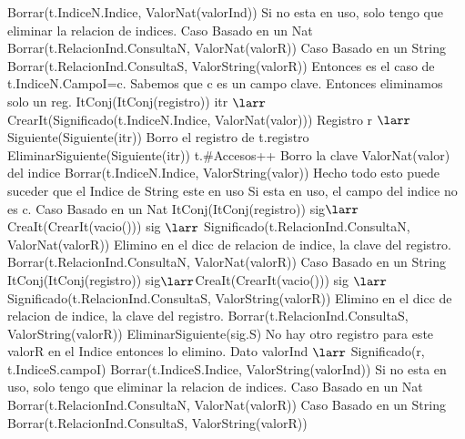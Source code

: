 {						\State Borrar(t.IndiceN.Indice, ValorNat(valorInd))
					\EndIf
				\Else
					\State Si no esta en uso, solo tengo que eliminar la relacion de indices.
						\State Caso Basado en un Nat
						\State Borrar(t.RelacionInd.ConsultaN, ValorNat(valorR))
					\Else
						\State Caso Basado en un String
						\State Borrar(t.RelacionInd.ConsultaS, ValorString(valorR))
					\EndIf
				\EndIf
			\Else
					\State Entonces es el caso de t.IndiceN.CampoI=c.
					\State Sabemos que c es un campo clave. Entonces eliminamos solo un reg.
					\State ItConj(ItConj(registro)) itr $\larr$ CrearIt(Significado(t.IndiceN.Indice, ValorNat(valor)))
					\State Registro r $\larr$ Siguiente(Siguiente(itr))
					\State Borro el registro de t.registro
					\State EliminarSiguiente(Siguiente(itr))
					\State	t.\#Accesos++
					\State Borro la clave ValorNat(valor) del indice
					\State Borrar(t.IndiceN.Indice, ValorString(valor))
					\State Hecho todo esto puede suceder que el Indice de String este en uso
					\State Si esta en uso, el campo del indice no es c.
							\State Caso Basado en un Nat
							\State ItConj(ItConj(registro)) sig$\larr$CreaIt(CrearIt(vacio()))
							\State sig $\larr$ Significado(t.RelacionInd.ConsultaN, ValorNat(valorR))
							\State Elimino en el dicc de relacion de indice, la clave del registro.
							\State Borrar(t.RelacionInd.ConsultaN, ValorNat(valorR))
						\Else
							\State Caso Basado en un String
							\State ItConj(ItConj(registro)) sig$\larr$CreaIt(CrearIt(vacio()))
							\State sig $\larr$ Significado(t.RelacionInd.ConsultaS, ValorString(valorR))
							\State Elimino en el dicc de relacion de indice, la clave del registro.
							\State Borrar(t.RelacionInd.ConsultaS, ValorString(valorR))
						\EndIf
						\State EliminarSiguiente(sig.S)
							\State No hay otro registro para este valorR en el Indice
							\State entonces lo elimino.
							\State Dato valorInd $\larr$ Significado(r, t.IndiceS.campoI)
							\State Borrar(t.IndiceS.Indice, ValorString(valorInd))
						\EndIf
					\Else
						\State Si no esta en uso, solo tengo que eliminar la relacion de indices.
							\State Caso Basado en un Nat
							\State Borrar(t.RelacionInd.ConsultaN, ValorNat(valorR))
						\Else
							\State Caso Basado en un String
							\State Borrar(t.RelacionInd.ConsultaS, ValorString(valorR))
						\EndIf
					\EndIf
				\EndIf
			\EndIf
}
